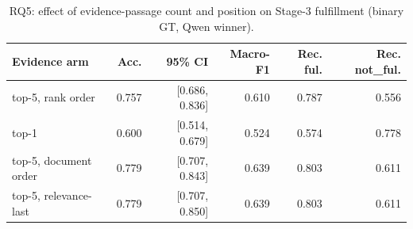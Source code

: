 \begin{table}[htbp]
  \centering
  \caption{RQ5: effect of evidence-passage count and position on Stage-3 fulfillment (binary GT, Qwen winner).}
  \label{tab:rq5-ordering}
  \begin{tabular}{lrrrrr}
    \toprule
    Evidence arm & Acc. & 95\% CI & Macro-F1 & Rec. ful. & Rec. not\_ful. \\
    \midrule
    top-5, rank order & 0.757 & [0.686, 0.836] & 0.610 & 0.787 & 0.556 \\
    top-1 & 0.600 & [0.514, 0.679] & 0.524 & 0.574 & 0.778 \\
    top-5, document order & 0.779 & [0.707, 0.843] & 0.639 & 0.803 & 0.611 \\
    top-5, relevance-last & 0.779 & [0.707, 0.850] & 0.639 & 0.803 & 0.611 \\
    \bottomrule
  \end{tabular}
\end{table}
